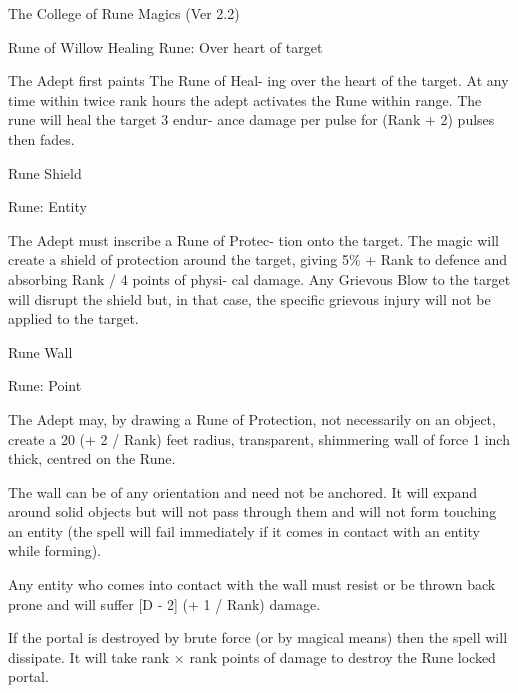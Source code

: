 \begin{Chapter}{The College of Rune Magics (Ver 2.2)}
\begin{spell}[S-9]{Rune of Willow Healing }
Rune: Over heart of target 
\begin{effects}
 The  Adept  first  paints  The  Rune  of  Heal-
ing over the heart of the target. At any time within 
twice  rank  hours  the  adept  activates  the  Rune 
within range. The rune will heal the target 3 endur-
ance  damage  per  pulse  for  (Rank  + 2)  pulses  then 
fades. 

\end{effects}
\end{spell}

\begin{spell}[S-10]{Rune Shield }

Rune: Entity 
\begin{effects}
The Adept must inscribe a Rune of Protec-
tion onto the target. The magic will create a shield 
of protection around the target, giving  5\% + Rank 
to defence and absorbing Rank / 4 points of physi-
cal  damage.  Any  Grievous  Blow  to  the  target  will 
disrupt  the  shield  but,  in  that  case,  the  specific 
grievous injury will not be applied to the target. 

\end{effects}
\end{spell}

\begin{spell}[S-11]{Rune Wall }

Rune: Point 
\begin{effects}
 The  Adept  may,  by  drawing  a  Rune  of 
Protection, not necessarily on an object, create a 20 
(+  2  /  Rank)  feet  radius,  transparent,  shimmering 
wall of force 1 inch thick, centred on the Rune. 

The wall can be of any orientation and need not be 
anchored.  It  will  expand  around  solid  objects  but 
will  not  pass  through  them  and  will  not  form 
touching an entity (the spell will fail immediately if 
it comes in contact with an entity while forming). 

Any  entity  who  comes  into  contact  with  the  wall 
must resist or be thrown back prone and will suffer 
[D - 2] (+ 1 / Rank) damage. 

If  the  portal  is  destroyed  by  brute  force  (or  by 
magical means) then the spell will dissipate. It will 
take  rank  ×  rank  points  of  damage  to  destroy  the 
Rune locked portal. 


\end{effects}
\end{spell}
\end{Chapter}
